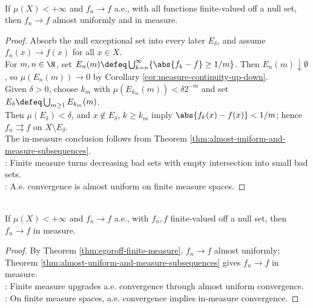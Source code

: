 \begin{theorem} \label{thm:egoroff-finite-measure} \\
If $\mu(X)<+\infty$ and $f_n\to f$ a.e., with all functions finite-valued off a null set,\\
then $f_n\to f$ almost uniformly and in measure.
\begin{proof}
Absorb the null exceptional set into every later $E_\delta$, and assume $f_n(x)\to f(x)$ for all $x\in X$.\\
For $m,n\in\N$, set $E_n(m)\defeq\bigcup_{k=n}^{\infty}\{\abs{f_k-f}\geq1/m\}$. Then $E_n(m)\downarrow\emptyset$, so $\mu(E_n(m))\to0$ by Corollary \ref{cor:measure-continuity-up-down}.\\
Given $\delta>0$, choose $k_m$ with $\mu(E_{k_m}(m))<\delta2^{-m}$ and set $E_\delta\defeq\bigcup_{m\geq1}E_{k_m}(m)$.\\
Then $\mu(E_\delta)<\delta$, and $x\notin E_\delta$, $k\geq k_m$ imply $\abs{f_k(x)-f(x)}<1/m$; hence $f_n\rightrightarrows f$ on $X\setminus E_\delta$.\\
The in-measure conclusion follows from Theorem \ref{thm:almost-uniform-and-measure-subsequences}.\\
: Finite measure turns decreasing bad sets with empty intersection into small bad sets.\\
: A.e. convergence is almost uniform on finite measure spaces.
\end{proof}
\end{theorem}

\begin{corollary} \label{cor:finite-measure-ae-implies-measure} \\
If $\mu(X)<+\infty$ and $f_n\to f$ a.e., with $f_n,f$ finite-valued off a null set, then $f_n\to f$ in measure.
\begin{proof}
By Theorem \ref{thm:egoroff-finite-measure}, $f_n\to f$ almost uniformly; Theorem \ref{thm:almost-uniform-and-measure-subsequences} gives $f_n\to f$ in measure.\\
: Finite measure upgrades a.e. convergence through almost uniform convergence.\\
: On finite measure spaces, a.e. convergence implies in-measure convergence.
\end{proof}
\end{corollary}

